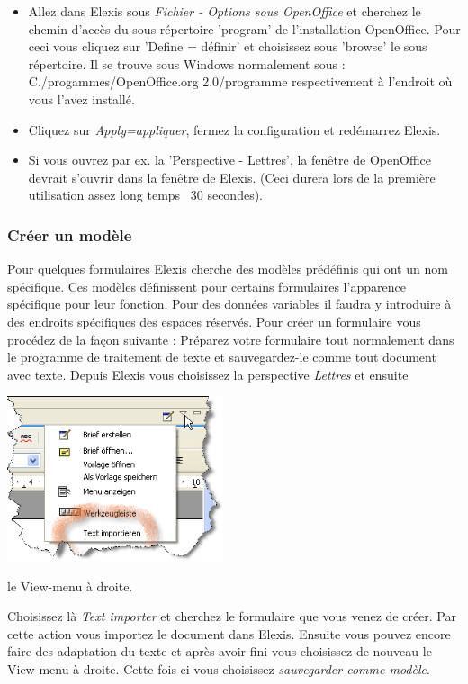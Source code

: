 \begin{itemize}
 \item Allez dans Elexis sous  \textit{Fichier - Options sous OpenOffice} et cherchez le chemin d'accès du sous répertoire 'program' de l'installation OpenOffice. Pour ceci vous cliquez sur 'Define = définir' et choisissez sous 'browse' le sous répertoire. Il se trouve sous Windows normalement sous : C./progammes/OpenOffice.org 2.0/programme respectivement à l'endroit où vous l'avez installé.
 \item Cliquez sur \textit{Apply=appliquer}, fermez la configuration et redémarrez Elexis. 
 \item Si vous ouvrez par ex. la 'Perspective - Lettres', la fenêtre de OpenOffice devrait s'ouvrir dans la fenêtre de Elexis. (Ceci durera lors de la première utilisation assez long temps ~30 secondes).
\end{itemize}

\subsubsection{Créer un modèle}
Pour quelques formulaires Elexis cherche des modèles prédéfinis qui ont un nom spécifique. Ces modèles définissent pour certains formulaires l'apparence spécifique pour leur fonction. Pour des données variables il faudra y introduire à des endroits spécifiques des espaces réservés.
Pour créer un formulaire vous procédez de la façon suivante :
Préparez votre formulaire tout normalement dans le programme de traitement de texte et sauvegardez-le comme tout document avec texte. Depuis Elexis vous choisissez la perspective \textit{Lettres} et ensuite 

\includegraphics[width=2.5in]{images/import.png}

le View-menu à droite.

Choisissez là  \textit{Text importer} et cherchez le formulaire que vous venez de créer. Par cette action vous importez le document dans Elexis. Ensuite vous pouvez encore faire des adaptation du texte et après avoir fini vous choisissez de nouveau le View-menu à droite. Cette fois-ci vous choisissez \textit{sauvegarder comme modèle}.


